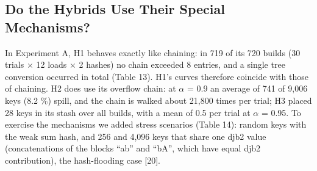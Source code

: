 \documentclass{ieeeaccess}
\begin{document}
\subsection{Do the Hybrids Use Their Special Mechanisms?}

\begin{table}[!t]
\caption{Hybrid-mechanism counters in Experiment A (mean per trial, djb2).}
\label{tab:13}
\centering
\scriptsize
{}
\end{table}


In Experiment A, H1 behaves exactly like chaining: in 719 of its 720 builds (30 trials $\times$ 12 loads $\times$ 2 hashes) no chain exceeded 8 entries, and a single tree conversion occurred in total (Table 13). H1's curves therefore coincide with those of chaining. H2 does use its overflow chain: at $\alpha$ = 0.9 an average of 741 of 9,006 keys (8.2 \%) spill, and the chain is walked about 21,800 times per trial; H3 placed 28 keys in its stash over all builds, with a mean of 0.5 per trial at $\alpha$ = 0.95. To exercise the mechanisms we added stress scenarios (Table 14): random keys with the weak sum hash, and 256 and 4,096 keys that share one djb2 value (concatenations of the blocks ``ab'' and ``bA'', which have equal djb2 contribution), the hash-flooding case [20].
\end{document}
